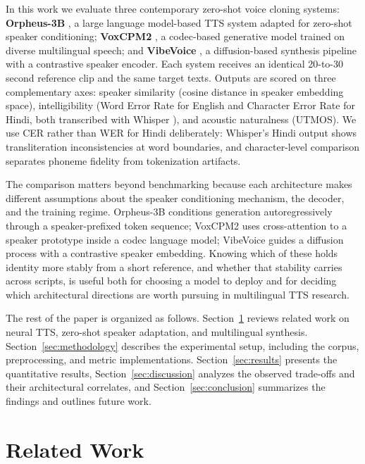 \documentclass[conference]{IEEEtran}
\begin{document}
In this work we evaluate three contemporary zero-shot voice cloning systems:
\textbf{Orpheus-3B} \cite{orpheus2024}, a large language model-based TTS
system adapted for zero-shot speaker conditioning; \textbf{VoxCPM2}
\cite{voxcpm2024}, a codec-based generative model trained on diverse
multilingual speech; and \textbf{VibeVoice} \cite{vibevoice2024}, a
diffusion-based synthesis pipeline with a contrastive speaker encoder. Each
system receives an identical 20-to-30 second reference clip and the same
target texts. Outputs are scored on three complementary axes: speaker
similarity (cosine distance in speaker embedding space), intelligibility
(Word Error Rate for English and Character Error Rate for Hindi, both
transcribed with Whisper \cite{radford2023whisper}), and acoustic naturalness
(UTMOS). We use CER rather than WER for Hindi deliberately: Whisper's Hindi
output shows transliteration inconsistencies at word boundaries, and
character-level comparison separates phoneme fidelity from tokenization
artifacts.

The comparison matters beyond benchmarking because each architecture makes
different assumptions about the speaker conditioning mechanism, the decoder,
and the training regime. Orpheus-3B conditions generation autoregressively
through a speaker-prefixed token sequence; VoxCPM2 uses cross-attention to a
speaker prototype inside a codec language model; VibeVoice guides a diffusion
process with a contrastive speaker embedding. Knowing which of these holds
identity more stably from a short reference, and whether that stability
carries across scripts, is useful both for choosing a model to deploy and for
deciding which architectural directions are worth pursuing in multilingual
TTS research.

The rest of the paper is organized as follows. Section~\ref{sec:related}
reviews related work on neural TTS, zero-shot speaker adaptation, and
multilingual synthesis. Section~\ref{sec:methodology} describes the
experimental setup, including the corpus, preprocessing, and metric
implementations. Section~\ref{sec:results} presents the quantitative results,
Section~\ref{sec:discussion} analyzes the observed trade-offs and their
architectural correlates, and Section~\ref{sec:conclusion} summarizes the
findings and outlines future work.

\section{Related Work}
\label{sec:related}
\end{document}
